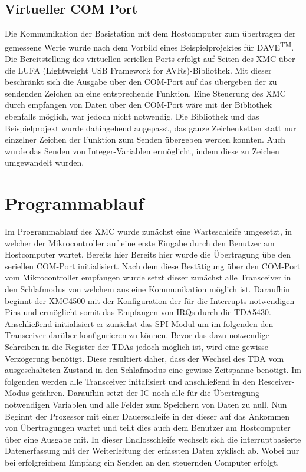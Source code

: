 \subsection{Virtueller COM Port}
Die Kommunikation der Basistation mit dem Hostcomputer zum übertragen der gemessene Werte wurde nach dem Vorbild eines Beispielprojektes für DAVE\textsuperscript{TM}. Die Bereitstellung des virtuellen seriellen Ports erfolgt auf Seiten des XMC über die LUFA (Lightweight USB Framework for AVRs)-Bibliothek. Mit dieser beschränkt sich die Ausgabe über den COM-Port auf das übergeben der zu sendenden Zeichen an eine entsprechende Funktion. Eine Steuerung des XMC durch empfangen von Daten über den COM-Port wäre mit der Bibliothek ebenfalls möglich, war jedoch nicht notwendig.
Die Bibliothek und das Beispielprojekt wurde dahingehend angepasst, das ganze Zeichenketten statt nur einzelner Zeichen der Funktion zum Senden übergeben werden konnten. Auch wurde das Senden von Integer-Variablen ermöglicht, indem diese zu Zeichen umgewandelt wurden. 
\section{Programmablauf}
Im Programmablauf des XMC wurde zunächst eine Warteschleife umgesetzt, in welcher der Mikrocontroller auf eine erste Eingabe durch den Benutzer am Hostcomputer wartet. Bereits hier Bereits hier wurde die Übertragung übe den seriellen COM-Port initialisiert. Nach dem diese Bestätigung über den COM-Port vom Mikrocontroller empfangen wurde setzt dieser zunächst alle Transceiver in den Schlafmodus von welchem aus eine Kommunikation möglich ist. Daraufhin beginnt der XMC4500 mit der Konfiguration der für die Interrupts notwendigen Pins und ermöglicht somit das Empfangen von \acp{IRQ} durch die TDA5430. Anschließend initialisiert er zunächst das SPI-Modul um im folgenden den Transceiver darüber konfigurieren zu können. Bevor das dazu notwendige Schreiben in die Register der TDAs jedoch möglich ist, wird eine gewisse Verzögerung benötigt. Diese resultiert daher, dass der Wechsel des TDA vom ausgeschalteten Zustand in den Schlafmodus eine gewisse Zeitspanne benötigt. 
Im folgenden werden alle Transceiver initalisiert und anschließend in den Resceiver-Modus gefahren.  
Daraufhin setzt der \ac{IC} noch alle für die Übertragung notwendigen Variablen  und alle Felder zum Speichern von Daten zu null. 
Nun Beginnt der Prozessor mit einer Dauerschleife in der dieser auf das Ankommen von Übertragungen wartet und teilt dies auch dem Benutzer am Hostcomputer über eine Ausgabe mit. In dieser Endlosschleife wechselt sich die interruptbasierte Datenerfassung mit der Weiterleitung der erfassten Daten zyklisch ab. Wobei nur bei erfolgreichem Empfang ein Senden an den steuernden Computer erfolgt. 

